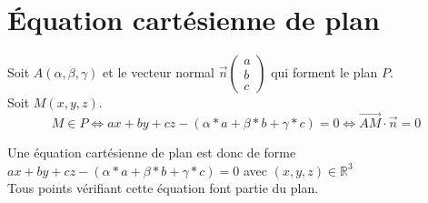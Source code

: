 \documentclass{article}
\begin{document}
	\section{Équation cartésienne de plan}

	Soit $A(\alpha,\beta,\gamma)$ et le vecteur normal $\vec{n} \begin{pmatrix}a\\b\\c\end{pmatrix}$ qui forment le plan $P$. \\
	Soit $M(x,y,z)$.
	\[
		M\in P \Leftrightarrow ax+by+cz-(\alpha*a+\beta*b+\gamma*c) = 0 \Leftrightarrow \vec{AM} \cdot \vec{n} = 0
	\]

	Une équation cartésienne de plan est donc de forme $ax+by+cz-(\alpha*a+\beta*b+\gamma*c) = 0$ avec $(x,y,z)\in\mathbb{R}^3$ \\
	Tous points vérifiant cette équation font partie du plan.
\end{document}
